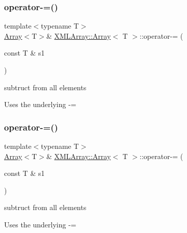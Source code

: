 \subsubsection{\texorpdfstring{operator-\/=()}{operator-=()}\hspace{0.1cm}{\footnotesize\ttfamily [3/4]}}
{\footnotesize\ttfamily template$<$typename T$>$ \\
\mbox{\hyperlink{classXMLArray_1_1Array}{Array}}$<$T$>$\& \mbox{\hyperlink{classXMLArray_1_1Array}{X\+M\+L\+Array\+::\+Array}}$<$ T $>$\+::operator-\/= (\begin{DoxyParamCaption}\item[{const T \&}]{s1 }\end{DoxyParamCaption})\hspace{0.3cm}{\ttfamily [inline]}}



subtruct from all elements 

Uses the underlying -\/= \mbox{\label{classXMLArray_1_1Array_af903951b5031ab6aa7ee8e2682055f91}} 
\subsubsection{\texorpdfstring{operator-\/=()}{operator-=()}\hspace{0.1cm}{\footnotesize\ttfamily [4/4]}}
{\footnotesize\ttfamily template$<$typename T$>$ \\
\mbox{\hyperlink{classXMLArray_1_1Array}{Array}}$<$T$>$\& \mbox{\hyperlink{classXMLArray_1_1Array}{X\+M\+L\+Array\+::\+Array}}$<$ T $>$\+::operator-\/= (\begin{DoxyParamCaption}\item[{const T \&}]{s1 }\end{DoxyParamCaption})\hspace{0.3cm}{\ttfamily [inline]}}



subtruct from all elements 

Uses the underlying -\/= \mbox{\label{classXMLArray_1_1Array_ad729e7678e412fb09104173dbe12a1fc}} 

